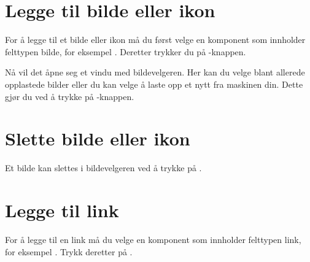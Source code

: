 \section{Legge til bilde eller ikon}
For å legge til et bilde eller ikon må du først velge en komponent som innholder felttypen bilde, for eksempel . Deretter trykker du på -knappen.

\begin{figure}[H]
    \centering
    \label{fig:cms-upload-image}
\end{figure}

 Nå vil det åpne seg et vindu med bildevelgeren. Her kan du velge blant allerede opplastede bilder eller du kan velge å laste opp et nytt fra maskinen din. Dette gjør du ved å trykke på -knappen.
 
\begin{figure}[H]
    \centering
    \label{fig:cms-upload-new-image}
\end{figure}

\section{Slette bilde eller ikon}
Et bilde kan slettes i bildevelgeren ved å trykke på .

\begin{figure}[H]
    \centering
    \label{fig:cms-delete-image}
\end{figure}




\section{Legge til link}
For å legge til en link må du velge en komponent som innholder felttypen link, for eksempel . Trykk deretter på .
 
